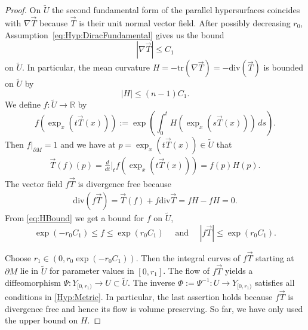 \documentclass[a4paper,10pt,reqno]{amsart}
\newcommand{\R}{\mathbb{R}}
\newcommand{\dM}{\partial M}
\renewcommand{\div}{\mathrm{div}}
\theoremstyle{definition}
\begin{document}
\begin{proof}
On $\tilde U$ the second fundamental form of the parallel hypersurfaces coincides with $\nabla\vec{T}$ because $\vec{T}$ is their unit normal vector field.
After possibly decreasing $r_0$, Assumption~\ref{eq:Hyp:DiracFundamental} gives us the bound
\begin{equation}
|\nabla\vec{T}| \le C_1
\label{eq:nablaTbound}
\end{equation}
on $\tilde U$.
In particular, the mean curvature $H=-\mathrm{tr}(\nabla\vec{T})=-\div(\vec{T})$ is bounded on $\tilde U$ by
\begin{equation}
|H|\le (n-1)C_1.
\label{eq:HBound}
\end{equation}
We define $f\colon \tilde U\to \R$ by
$$
f(\exp_x(t\vec{T}(x))) := \exp\left(\int_0^t H(\exp_x(s\vec{T}(x)))\, ds\right) .
$$
Then $f|_{\dM}=1$ and we have at $p=\exp_x(t\vec{T}(x))\in\tilde U$ that
\begin{align*}
\vec{T}(f)(p)
=
\tfrac{d}{dt}|_t f(\exp_x(t\vec{T}(x)))
=
f(p)H(p).
\end{align*}
The vector field $f\vec{T}$ is divergence free because
\begin{align*}
\div(f\vec{T})
=
\vec{T}(f) + f\div\vec{T}
=
fH - fH
=
0.
\end{align*}
From \eqref{eq:HBound} we get a bound for $f$ on $\tilde U$,
$$
\exp(-r_0C_1) \le f \le \exp(r_0C_1) \quad\text{ and }\quad |f\vec{T}|\le\exp(r_0C_1) .
$$

Choose $r_1\in (0,r_0\exp(-r_0C_1))$.
Then the integral curves of $f\vec{T}$ starting at $\dM$ lie in $\tilde U$ for parameter values in $[0,r_1]$.
The flow of $f\vec{T}$ yields a diffeomorphism $\Psi\colon Y_{[0,r_1)}\to U \subset \tilde U$.
The inverse $\Phi := \Psi^{-1}\colon U\to Y_{[0,r_1)}$ satisfies all conditions in \ref{Hyp:Metric}.
In particular, the last assertion holds because $f\vec{T}$ is divergence free and hence its flow is volume preserving.
So far, we have only used the upper bound on $H$.


\end{proof}
\end{document}
